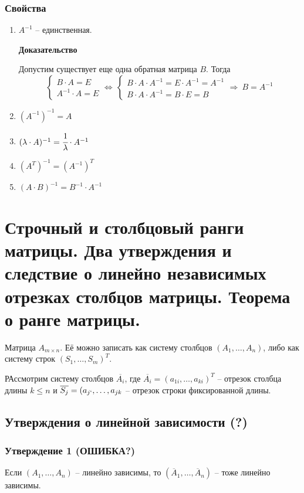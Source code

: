 \documentclass{article}
\begin{document}
\subsubsection{Свойства}
\begin{enumerate}
    \item $A^{-1}$ -- единственная.
    
    \textbf{Доказательство}
    
    Допустим существует еще одна обратная матрица $B$. Тогда
    $$\begin{cases} B\cdot A=E \\ A^{-1}\cdot A=E \end{cases}\Leftrightarrow\, \begin{cases} B\cdot A \cdot A^{-1} = E\cdot A^{-1}=A^{-1} \\ B\cdot A\cdot A^{-1}=B\cdot E=B \end{cases} \Rightarrow\: B=A^{-1}$$
    
    \item $(A^{-1})^{-1}=A$
    \item $(\lambda\cdot A)^{-1} = \cfrac{1}{\lambda}\cdot A^{-1}$
    \item $(A^T)^{-1}=(A^{-1})^T$
    \item $(A\cdot B)^{-1}=B^{-1}\cdot A^{-1}$
\end{enumerate}
\newpage
\section{Строчный и столбцовый ранги матрицы. Два утверждения и следствие о линейно независимых отрезках столбцов матрицы. Теорема о ранге матрицы.}

Матрица $A_{m\times n}$. Её можно записать как систему столбцов $(A_1,\ldots,A_n)$, либо как систему строк $(S_1,\ldots,S_m)^T$.

РАссмотрим систему столбцов $\overline{A_i}$, где $\overline{A_i}=(a_{1i},\ldots,a_{ki})^T$ -- отрезок столбца длины $k\leqslant n$ и $\overline{S_j}=(a_{j`},\ldots,a_{jk}$ -- отрезок строки фиксированной длины.

\subsection{Утверждения о линейной зависимости (?)}
\subsubsection{Утверждение 1 (ОШИБКА?)}
Если $(A_1,\ldots,A_n)$ -- линейно зависимы, то $(\overline{A}_1,\ldots,\overline{A}_n)$ -- тоже линейно зависимы.
\end{document}
